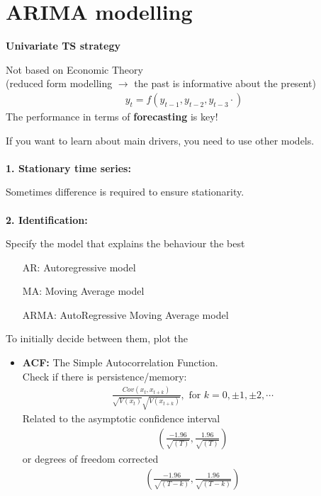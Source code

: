 \section{ARIMA modelling}
\begin{multicols}{2}\noindent
\textbf{Univariate TS strategy}\par
Not based on Economic Theory\\
(reduced form modelling $\rightarrow$ the past is informative about the present)
\begin{align*}
y_t = f(y_{t-1},y_{t-2},y_{t-3}\cdot)
\end{align*}
The performance in terms of \textbf{forecasting} is key!\par
If you want to learn about main drivers, you need to use other models.\\
\\
\textbf{1. Stationary time series:}\par
Sometimes  difference is required to ensure stationarity.\\
\\
\textbf{2. Identification:}\par
Specify the model that explains the behaviour the best
\begin{itemize}
  \item[AR:] Autoregressive model
  \item[MA:] Moving Average model
  \item[ARMA:] AutoRegressive Moving Average model
\end{itemize}
To initially decide between them, plot the
\begin{itemize}
  \item \textbf{ACF:} The Simple Autocorrelation Function.\\
              Check if there is persistence/memory:
              \begin{align*}
                \frac{Cov(x_t,x_{t+k})}{\sqrt{V(x_t)}\sqrt{V(x_{t+k})}},\textrm{     for }k=0,\pm1,\pm2,\cdots
              \end{align*}
              Related to the asymptotic confidence interval
              \begin{align*}
                \left(\frac{-1.96}{\sqrt{(T)}}, \frac{1.96}{\sqrt{(T)}}  \right)
              \end{align*}
              or degrees of freedom corrected
              \begin{align*}
                \left(\frac{-1.96}{\sqrt{(T-k)}}, \frac{1.96}{\sqrt{(T-k)}}  \right)

\end{align*}
\end{itemize}
\end{multicols}
